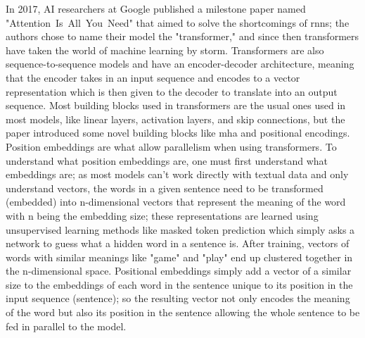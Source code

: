 In 2017, AI researchers at Google published a milestone paper named \\ \mbox{"Attention Is All You Need"} \cite{vaswani_attention_2017} that aimed to solve the shortcomings of \gls{rnn}s; the authors chose to name their model the "transformer," and since then transformers have taken the world of machine learning by storm. Transformers are also sequence-to-sequence models and have an encoder-decoder architecture, meaning that the encoder takes in an input sequence and encodes to a vector representation which is then given to the decoder to translate into an output sequence. Most building blocks used in transformers are the usual ones used in most models, like linear layers, activation layers, and skip connections, but the paper introduced some novel building blocks like \gls{mha} and positional encodings.
Position embeddings are what allow parallelism when using transformers. To understand what position embeddings are, one must first understand what embeddings are; as most models can't work directly with textual data and only understand vectors, the words in a given sentence need to be transformed (embedded) into n-dimensional vectors that represent the meaning of the word with n being the embedding size; these representations are learned using unsupervised learning methods like masked token prediction which simply asks a network to guess what a hidden word in a sentence is. After training, vectors of words with similar meanings like "game" and "play" end up clustered together in the n-dimensional space. Positional embeddings simply add a vector of a similar size to the embeddings of each word in the sentence unique to its position in the input sequence (sentence); so the resulting vector not only encodes the meaning of the word but also its position in the sentence allowing the whole sentence to be fed in parallel to the model.
